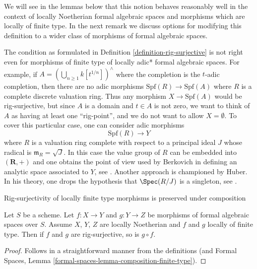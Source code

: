 \noindent
We will see in the lemmas below that this notion behaves reasonably well
in the context of locally Noetherian formal algebraic spaces and morphisms
which are locally of finite type.
In the next remark we discuss options for modifying this definition
to a wider class of morphisms of formal algebraic spaces.

\begin{remark}
\label{remark-rig-surjective-more-general}
The condition as formulated in Definition \ref{definition-rig-surjective}
is not right even for morphisms of finite type
of locally adic* formal algebraic spaces.
For example, if $A = (\bigcup_{n \geq 1} k[t^{1/n}])^\wedge$
where the completion is the $t$-adic completion, then
there are no adic morphisms $\text{Spf}(R) \to \text{Spf}(A)$
where $R$ is a complete discrete valuation ring.
Thus any morphism $X \to \text{Spf}(A)$ would be rig-surjective,
but since $A$ is a domain and $t \in A$ is not zero, we want to
think of $A$ as having at least one ``rig-point'', and we do not
want to allow $X = \emptyset$. To cover this
particular case, one can consider adic morphisms
$$
\text{Spf}(R) \longrightarrow Y
$$
where $R$ is a valuation ring complete with respect to a principal
ideal $J$ whose radical is $\mathfrak m_R = \sqrt{J}$.
In this case the value group of $R$ can be embedded into
$(\mathbf{R}, +)$ and one obtains the point of view used by
Berkovich in defining an analytic space associated to $Y$, see
\cite{Berkovich}. Another approach is championed by Huber. In his theory,
one drops the hypothesis that $\Spec(R/J)$ is a singleton, see
\cite{Huber-continuous-valuations}.
\end{remark}

\begin{lemma}
\label{lemma-composition-rig-surjective}
\begin{slogan}
Rig-surjectivity of locally finite type morphisms is preserved under
composition
\end{slogan}
Let $S$ be a scheme. Let $f : X \to Y$ and $g : Y \to Z$ be morphisms of formal
algebraic spaces over $S$. Assume $X$, $Y$, $Z$ are locally Noetherian and
$f$ and $g$ locally of finite type. Then if $f$ and $g$ are rig-surjective,
so is $g \circ f$.
\end{lemma}

\begin{proof}
Follows in a straightforward manner from the definitions
(and Formal Spaces, Lemma \ref{formal-spaces-lemma-composition-finite-type}).
\end{proof}

